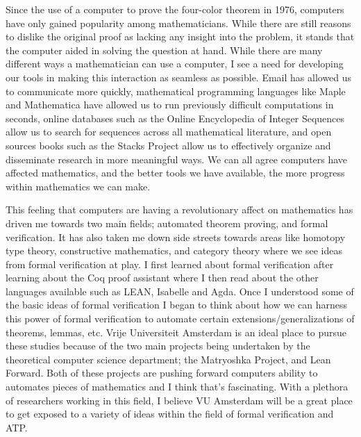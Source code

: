 \documentclass[11pt]{article}
\begin{document}
Since the use of a computer to prove the four-color theorem in 1976, computers have only gained popularity among mathematicians. While there are still reasons to dislike the original proof as lacking any insight into the problem, it stands that the computer aided in solving the question at hand. While there are many different ways a mathematician can use a computer, I see a need for developing our tools in making this interaction as seamless as possible. Email has allowed us to communicate more quickly, mathematical programming languages like Maple and Mathematica have allowed us to run previously difficult computations in seconds, online databases such as the Online Encyclopedia of Integer Sequences allow us to search for sequences across all mathematical literature, and open sources books such as the Stacks Project allow us to effectively organize and disseminate research in more meaningful ways. We can all agree computers have affected mathematics, and the better tools we have available, the more progress within mathematics we can make.

This feeling that computers are having a revolutionary affect on mathematics has driven me towards two main fields; automated theorem proving, and formal verification. It has also taken me down side streets towards areas like homotopy type theory, constructive mathematics, and category theory where we see ideas from formal verification at play. I first learned about formal verification after learning about the Coq proof assistant where I then read about the other languages available such as LEAN, Isabelle and Agda. Once I understood some of the basic ideas of formal verification I began to think about how we can harness this power of formal verification to automate certain extensions/generalizations of theorems, lemmas, etc. Vrije Universiteit Amsterdam is an ideal place to pursue these studies because of the two main projects being undertaken by the theoretical computer science department; the Matryoshka Project, and Lean Forward. Both of these projects are pushing forward computers ability to automates pieces of mathematics and I think that's fascinating. With a plethora of researchers working in this field, I believe VU Amsterdam will be a great place to get exposed to a variety of ideas within the field of formal verification and ATP.
\end{document}
